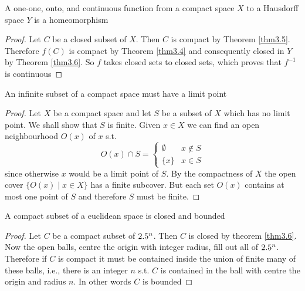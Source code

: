 \documentclass[11pt]{article}
\begin{document}
\begin{theorem}[]
A one-one, onto, and continuous function from a compact space \(X\) to a
Hausdorff space \(Y\) is a homeomorphism
\end{theorem}

\begin{proof}
Let \(C\) be a closed subset of \(X\). Then \(C\) is compact by Theorem
\ref{thm3.5}. Therefore \(f(C)\) is compact by Theorem \ref{thm3.4} and
consequently closed in \(Y\) by Theorem \ref{thm3.6}. So \(f\) takes closed
sets to closed sets, which proves that \(f^{-1}\) is continuous
\end{proof}

\begin{theorem}
An infinite subset of a compact space must have a limit point
\end{theorem}

\begin{proof}
Let \(X\) be a compact space and let \(S\) be a subset of \(X\) which has no
limit point. We shall show that \(S\) is finite. Given \(x\in X\) we can find
an open neighbourhood \(O(x)\) of \(x\) s.t.
\begin{equation*}
O(x)\cap S=
\begin{cases}
\emptyset&x\not\in S\\
\{x\}&x\in S
\end{cases}
\end{equation*}
since otherwise \(x\) would be a limit point of \(S\). By the compactness of
\(X\) the open cover \(\{O(x)\mid x\in X\}\) has a finite subcover. But each
set \(O(x)\) contains at most one point of \(S\) and therefore \(S\) must be finite.
\end{proof}

\begin{theorem}[]
\label{thm3.9}
A compact subset of a euclidean space is closed and bounded
\end{theorem}

\begin{proof}
Let \(C\) be a compact subset of \(2.5^n\). Then \(C\) is closed by theorem
\ref{thm3.6}. Now the open balls, centre the origin with integer radius, fill
out all of \(2.5^n\). Therefore if \(C\) is compact it must be contained
inside the union of finite many of these balls, i.e., there is an integer
\(n\) s.t. \(C\) is contained in the ball with centre the origin and radius
\(n\). In other words \(C\) is bounded
\end{proof}
\end{document}
